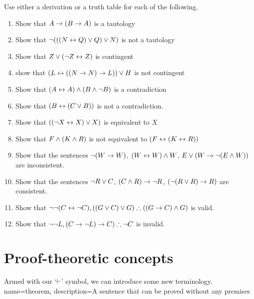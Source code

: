 \begin{practiceproblems}
\noindent\problempart Use either a derivation or a truth table for each of the following.
\begin{enumerate}%
\item Show that $A \rightarrow (B \rightarrow A)$ is a tautology
\item Show that $\neg (((N \leftrightarrow Q) \vee Q) \vee N)$ is not a tautology
\item Show that $ Z \vee (\neg Z \leftrightarrow Z) $ is contingent
\item show that $ (L \leftrightarrow ((N \rightarrow N) \rightarrow L)) \vee H $ is not contingent
\item Show that $ (A \leftrightarrow A) \mathbin{\wedge} (B \mathbin{\wedge} \neg B)$ is a contradiction
\item Show that $ (B \leftrightarrow (C \vee B)) $ is not a contradiction.
\item Show that $ ((\neg X \leftrightarrow X) \vee X) $ is equivalent to $X$
\item Show that $F \mathbin{\wedge} (K \mathbin{\wedge} R) $ is not equivalent to $ (F \leftrightarrow (K \leftrightarrow R)) $
\item Show that the sentences $ \neg (W \rightarrow W)$, $(W \leftrightarrow W) \mathbin{\wedge} W$, $E \vee (W \rightarrow \neg (E \mathbin{\wedge} W))$ are inconsistent.
\item Show that the sentences  $\neg R \vee C $, $(C \mathbin{\wedge} R) \rightarrow \neg R$, $(\neg (R \vee R) \rightarrow R) $ are consistent.
\item Show that $\enot \enot (C \eiff \enot C), ((G \eor C) \eor G) \therefore ((G \eif C) \eand G) $ is valid.
\item Show that $ \enot \enot L,  (C \eif \enot L) \eif C) \therefore \enot C$ is invalid.
\end{enumerate}
\end{practiceproblems}


\chapter{Proof-theoretic concepts}\label{s:ProofTheoreticConcepts}


Armed with our `$\vdash$' symbol, we can introduce some new terminology.
{
name=theorem,
description={A sentence that can be proved without any premises}
}

